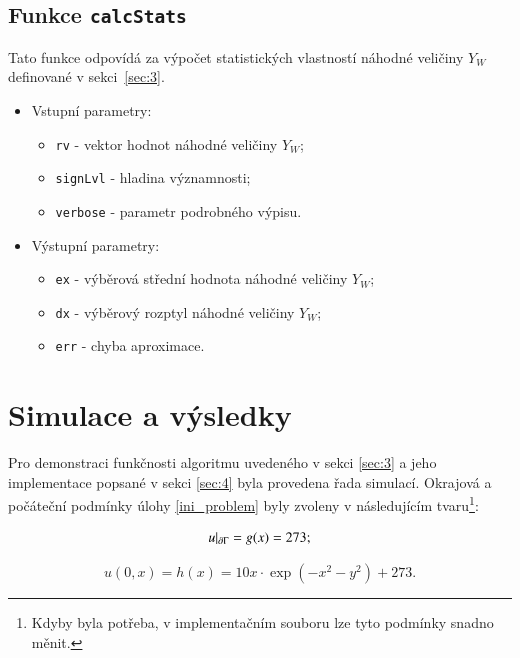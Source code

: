 \documentclass[11pt,american,czech]{article}
\begin{document}
\subsection{Funkce \texttt{calcStats}}\label{sec:4.3}

Tato funkce odpovídá za výpočet statistických vlastností náhodné veličiny $Y_{W}$ definované v sekci~\ref{sec:3}.

\begin{itemize}
	\item Vstupní parametry:
	\begin{itemize}
		\item \texttt{rv} - vektor hodnot náhodné veličiny $Y_{W}$;
		\item \texttt{signLvl} - hladina významnosti;
		\item \texttt{verbose} - parametr podrobného výpisu.
	\end{itemize}
	\item Výstupní parametry:
	\begin{itemize}
		\item \texttt{ex} - výběrová střední hodnota náhodné veličiny $Y_{W}$;
		\item \texttt{dx} - výběrový rozptyl náhodné veličiny $Y_{W}$;
		\item \texttt{err} - chyba aproximace.
	\end{itemize}
\end{itemize}

\section{Simulace a výsledky}

Pro demonstraci funkčnosti algoritmu uvedeného v sekci \ref{sec:3} a jeho implementace popsané v sekci \ref{sec:4} byla provedena řada simulací. Okrajová a počáteční podmínky úlohy \eqref{ini_problem} byly zvoleny v následujícím tvaru\footnote{Kdyby byla potřeba, v implementačním souboru lze tyto podmínky snadno měnit.}: 

\begin{equation}\label{eq:boundary_condition}
	u\arrowvert_{\partial\Gamma}=g(x)=273;
\end{equation}

\begin{equation}\label{eq:initial_condition}
	u(0,x)=h(x)=10x\cdot\exp(-x^2-y^2)+273.
\end{equation}
\end{document}
